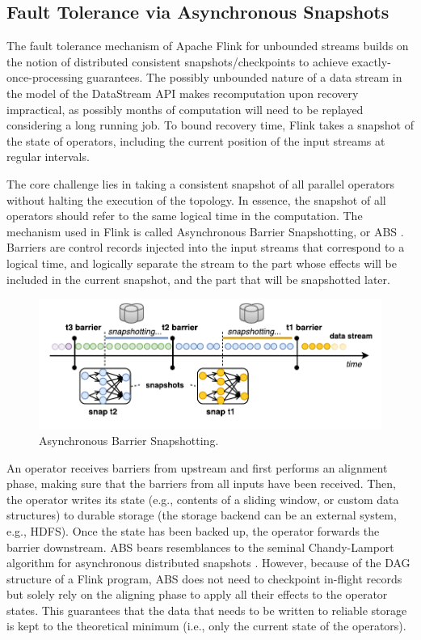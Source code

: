 \subsection{Fault Tolerance via Asynchronous Snapshots}
\label{sec:fault-tolerance}
The fault tolerance mechanism of Apache Flink for unbounded streams builds on the notion of distributed consistent snapshots/checkpoints to achieve exactly-once-processing guarantees. The possibly unbounded nature of a data stream in the model of the DataStream API makes recomputation upon recovery impractical, as possibly months of computation will need to be replayed considering a long running job. To bound recovery time, Flink takes a snapshot of the state of operators, including the current position of the input streams at regular intervals.

The core challenge lies in taking a consistent snapshot of all parallel operators without halting the execution of the topology. In essence, the snapshot of all operators should refer to the same logical time in the computation. The mechanism used in Flink is called Asynchronous Barrier Snapshotting, or ABS \cite{carbone2015lightweight}. Barriers are control records injected into the input streams that correspond to a logical time, and logically separate the stream to the part whose effects will be included in the current snapshot, and the part that will be snapshotted later.

\begin{figure}[ht]
	\centering  	
  	\includegraphics[width=.75\textwidth]{figs/snaps.pdf}
  	\vspace{-6mm}
	\caption{Asynchronous Barrier Snapshotting.}
	\vspace{-2mm}
	\label{fig:snapshots}
\end{figure}

An operator receives barriers from upstream and first performs an alignment phase, making sure that the barriers from all inputs have been received. Then, the operator writes its state (e.g., contents of a sliding window, or custom data structures) to durable storage (the storage backend can be an external system, e.g., HDFS). Once the state has been backed up, the operator forwards the barrier downstream. ABS bears resemblances to the seminal Chandy-Lamport algorithm for asynchronous distributed snapshots \cite{chandy1985distributed}. However, because of the DAG structure of a Flink program, ABS does not need to checkpoint in-flight records but solely rely on the aligning phase to apply all their effects to the operator states. This guarantees that the data that needs to be written to reliable storage is kept to the theoretical minimum (i.e., only the current state of the operators).

